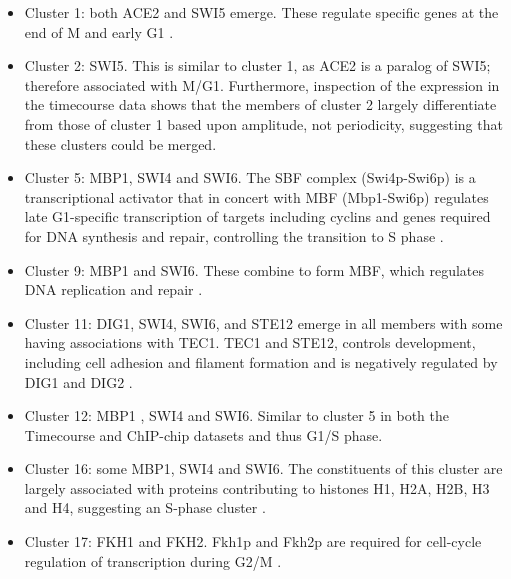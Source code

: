 \documentclass[]{article}
\begin{document}
\begin{itemize}
	\item Cluster 1: both ACE2 and SWI5 emerge. These regulate specific genes at the end of M and early G1 \citep{mcbride1999distinct, simon2001serial}.
	\item Cluster 2: SWI5. This is similar to cluster 1, as ACE2 is a paralog of SWI5; therefore associated with M/G1. Furthermore, inspection of the expression in the timecourse data shows that the members of cluster 2 largely differentiate from those of cluster 1 based upon amplitude, not periodicity, suggesting that these clusters could be merged.
	\item Cluster 5: MBP1, SWI4 and SWI6. The SBF complex (Swi4p-Swi6p) is a transcriptional activator that in concert with	MBF (Mbp1-Swi6p) regulates late G1-specific transcription of targets including cyclins and genes required for DNA synthesis and repair, controlling the transition to S phase \citep{simon2001serial,iyer2001genomic, aligianni2009fission}. 
	\item Cluster 9: MBP1 and SWI6. These combine to form MBF, which regulates DNA replication and repair \citep{iyer2001genomic}.
	\item Cluster 11: DIG1, SWI4, SWI6, and STE12 emerge in all members with some having associations with TEC1. TEC1 and STE12, controls development, including cell adhesion and filament formation and is negatively regulated by DIG1 and DIG2 \citep{van2014transcription}.
	\item Cluster 12: MBP1 , SWI4 and SWI6. Similar to cluster 5 in both the Timecourse and ChIP-chip datasets and thus G1/S phase.
	\item Cluster 16: some MBP1, SWI4 and SWI6. The constituents of this cluster are largely associated with proteins contributing to histones H1, H2A, H2B, H3 and H4, suggesting an S-phase cluster \citep{ewen2000cell}.
	\item Cluster 17: FKH1 and FKH2. Fkh1p and Fkh2p are required for cell-cycle regulation of transcription during G2/M \citep{kumar2000forkhead}. 

\end{itemize}
\end{document}
